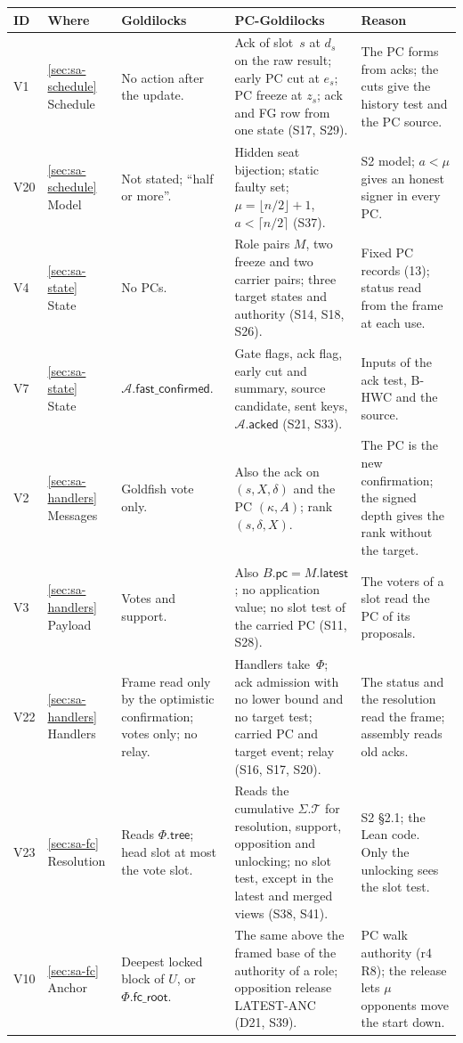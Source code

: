 \documentclass{article}
\newcommand{\T}{\mathcal T}
\newcommand{\AC}{\mathcal A}
\newcommand{\Fr}{\Phi}
\newcommand{\tree}{\mathsf{tree}}
\newcommand{\fcroot}{\mathsf{fc\_root}}
\newcommand{\fastConfirmed}{\mathsf{fast\_confirmed}}
\newcommand{\pc}{\mathsf{pc}}
\newcommand{\acked}{\mathsf{acked}}
\begin{document}
{\footnotesize
\setlength{\tabcolsep}{3pt}
\begin{longtable}{@{}p{0.6cm}p{2.1cm}p{3.6cm}p{3.9cm}p{4.3cm}@{}}
\hline
ID & Where & Goldilocks & PC-Goldilocks & Reason\\
\hline
\endhead
V1 & \ref{sec:sa-schedule} Schedule & No action after the update. & Ack of slot~$s$ at $d_s$ on the raw result; early PC cut at $e_s$; PC freeze at $z_s$; ack and FG row from one state (S17, S29). & The PC forms from acks; the cuts give the history test and the PC source.\\
V20 & \ref{sec:sa-schedule} Model & Not stated; ``half or more''. & Hidden seat bijection; static faulty set; $\mu=\lfloor n/2\rfloor+1$, $a<\lceil n/2\rceil$ (S37). & S2 model; $a<\mu$ gives an honest signer in every PC.\\
V4 & \ref{sec:sa-state} State & No PCs. & Role pairs $M$, two freeze and two carrier pairs; three target states and authority (S14, S18, S26). & Fixed PC records (13); status read from the frame at each use.\\
V7 & \ref{sec:sa-state} State & $\AC.\fastConfirmed$. & Gate flags, ack flag, early cut and summary, source candidate, sent keys, $\AC.\acked$ (S21, S33). & Inputs of the ack test, B-HWC and the source.\\
V2 & \ref{sec:sa-handlers} Messages & Goldfish vote only. & Also the ack on $(s,X,\delta)$ and the PC $(\kappa,A)$; rank $(s,\delta,X)$. & The PC is the new confirmation; the signed depth gives the rank without the target.\\
V3 & \ref{sec:sa-handlers} Payload & Votes and support. & Also $B.\pc=M.\mathsf{latest}$; no application value; no slot test of the carried PC (S11, S28). & The voters of a slot read the PC of its proposals.\\
V22 & \ref{sec:sa-handlers} Handlers & Frame read only by the optimistic confirmation; votes only; no relay. & Handlers take~$\Fr$; ack admission with no lower bound and no target test; carried PC and target event; relay (S16, S17, S20). & The status and the resolution read the frame; assembly reads old acks.\\
V23 & \ref{sec:sa-fc} Resolution & Reads $\Fr.\tree$; head slot at most the vote slot. & Reads the cumulative $\Sigma.\T$ for resolution, support, opposition and unlocking; no slot test, except in the latest and merged views (S38, S41). & S2 \S2.1; the Lean code.  Only the unlocking sees the slot test.\\
V10 & \ref{sec:sa-fc} Anchor & Deepest locked block of $U$, or $\Fr.\fcroot$. & The same above the framed base of the authority of a role; opposition release LATEST-ANC (D21, S39). & PC walk authority (r4 R8); the release lets $\mu$ opponents move the start down.\\

\end{longtable}}
\end{document}
